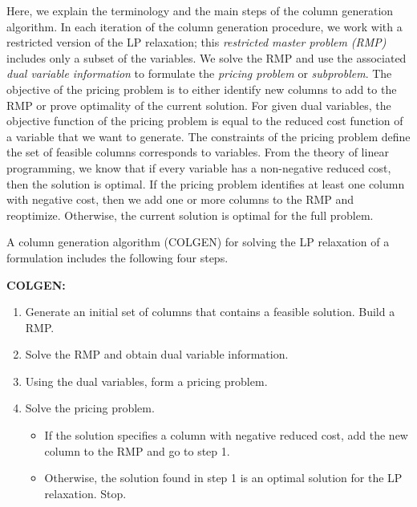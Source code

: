 Here, we explain the terminology and the main steps of the column generation algorithm.
In each iteration of the column generation procedure, we work with a restricted version 
of the LP relaxation; this {\em restricted master problem (RMP)} includes only a subset 
of the variables. We solve the RMP and use the associated {\em dual variable information} 
to formulate the {\em pricing problem} or {\em subproblem}. The objective of the pricing 
problem is to either identify new columns to add to the RMP or prove optimality of 
the current solution. For given dual variables, the objective function of the pricing 
problem is equal to the reduced cost function of a variable that we want to generate. 
The constraints of the pricing problem define the set of feasible columns corresponds 
to variables. From the theory of linear programming, we know that if every 
variable has a non-negative reduced cost, then the solution is optimal.
If the pricing problem identifies at least one column with negative cost, then we add
one or more columns to the RMP and reoptimize. Otherwise, the current solution is 
optimal for the full problem.

A column generation algorithm (COLGEN) for solving the LP relaxation of a formulation 
includes the following four steps.

{\bf COLGEN:}
\begin{enumerate}
\item[0.] Generate an initial set of columns that contains a feasible solution. Build a RMP.
\item[1.] Solve the RMP and obtain dual variable information.
\item[2.] Using the dual variables, form a pricing problem. 
\item[3.] Solve the pricing problem. 
  \begin{itemize}
  \item[i.]If the solution specifies a column with negative
    reduced cost, add the new column to the RMP and go to step 1. 
  \item[ii.]Otherwise, the solution found in step 1 is an optimal solution for 
    the LP relaxation. Stop.
  \end{itemize}
\end {enumerate}

